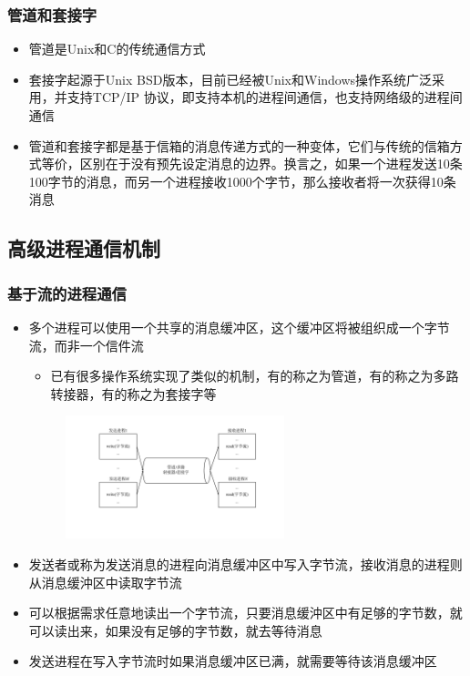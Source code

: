 \documentclass[cs4size,a4paper,10pt]{ctexart}
\begin{document}
	\subsubsection{管道和套接字}
	\begin{itemize}
		\item 管道是Unix和C的传统通信方式
		\item 套接字起源于Unix BSD版本，目前已经被Unix和Windows操作系统广泛采用，并支持TCP/IP 协议，即支持本机的进程间通信，也支持网络级的进程间通信
		\item 管道和套接字都是基于信箱的消息传递方式的一种变体，它们与传统的信箱方式等价，区别在于没有预先设定消息的边界。换言之，如果一个进程发送10条100字节的消息，而另一个进程接收1000个字节，那么接收者将一次获得10条消息
	\end{itemize}


	\subsection{高级进程通信机制}

	\subsubsection{基于流的进程通信}
	\begin{itemize}
		\item 多个进程可以使用一个共享的消息缓冲区，这个缓冲区将被组织成一个字节流，而非一个信件流
		\begin{itemize}
			\item 已有很多操作系统实现了类似的机制，有的称之为管道，有的称之为多路转接器，有的称之为套接字等
		\end{itemize}
		\begin{figure}[H]
			\centering
			\includegraphics[width=0.6\textwidth]{img/基于流的进程通信.pdf}
		\end{figure}
		\item 发送者或称为发送消息的进程向消息缓冲区中写入字节流，接收消息的进程则从消息缓沖区中读取字节流
		\item 可以根据需求任意地读出一个字节流，只要消息缓沖区中有足够的字节数，就可以读出来，如果没有足够的字节数，就去等待消息
		\item 发送进程在写入字节流时如果消息缓冲区已满，就需要等待该消息缓冲区
	\end{itemize}
	
\end{document}
